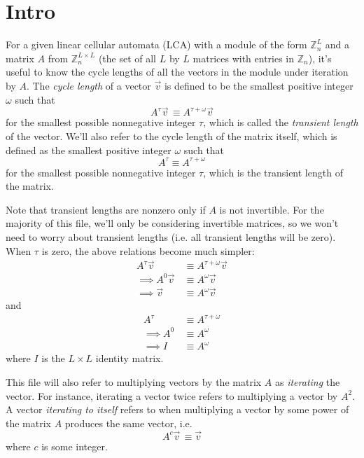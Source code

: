 \documentclass[a4paper, 12pt, reqno]{amsart}
\begin{document}
	\section{Intro}
	For a given linear cellular automata (LCA) with a module of the form $\mathds{Z}_{n}^L$ and a matrix $A$ from $\mathds{Z}_{n}^{L \times L}$ (the set of all $L$ by $L$ 
	matrices with entries in $\mathds{Z}_n$), it's useful to know the cycle lengths of all the vectors in the module under iteration by $A$. The \emph{cycle length} of a 
	vector $\vec{v}$ is defined to be the smallest positive integer $\omega$ such that
	\[
		A^\tau\vec{v} \, \equiv A^{\tau + \omega}\vec{v}
	\]
	for the smallest possible nonnegative integer $\tau$, which is called the \emph{transient length} of the vector. We'll also refer to the cycle length of the matrix 
	itself, which is defined as the smallest positive integer $\omega$ such that
	\[
		A^\tau \equiv A^{\tau + \omega}
	\]
	for the smallest possible nonnegative integer $\tau$, which is the transient length of the matrix.
	
	Note that transient lengths are nonzero only if $A$ is not invertible. For the majority of this file, we'll only be considering invertible matrices, so we won't need to
	worry about transient lengths (i.e. all transient lengths will be zero). When $\tau$ is zero, the above relations become much simpler:
	\begin{align*}
		         A^\tau\vec{v} \, & \equiv A^{\tau + \omega}\vec{v} \\
		\implies A^0\vec{v}    \, & \equiv A^\omega\vec{v}          \\
		\implies \vec{v}       \, & \equiv A^\omega\vec{v}
	\end{align*}
	and
	\begin{align*}
		         A^\tau \, & \equiv A^{\tau + \omega} \\
		\implies A^0    \, & \equiv A^\omega          \\
		\implies I      \, & \equiv A^\omega
	\end{align*}
	where $I$ is the $L \times L$ identity matrix.
	
	This file will also refer to multiplying vectors by the matrix $A$ as \emph{iterating} the vector. For instance, iterating a vector twice refers to multiplying a vector
	by $A^2$. A vector \emph{iterating to itself} refers to when multiplying a vector by some power of the matrix $A$ produces the same vector, i.e.
	\[
		A^c\vec{v} \, \equiv \vec{v}
	\]
	where $c$ is some integer.
	
\end{document}
